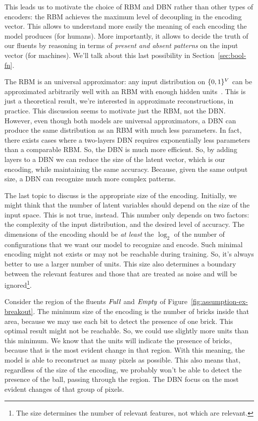This leads us to motivate the choice of RBM and DBN rather than other types of
encoders: the RBM achieves the maximum level of decoupling in the encoding
vector. This allows to understand more easily the meaning of each encoding the
model produces (for humans). More importantly, it allows to decide the truth
of our fluents by reasoning in terms of \emph{present and absent patterns} on
the input vector (for machines). We'll talk about this last possibility in
Section~\ref{sec:bool-fn}.

The RBM is an universal approximator: any input distribution on $\{0, 1\}^V$
can be approximated arbitrarily well with an RBM with enough hidden
units~\cite{bib:rbm-universality}. This is just a theoretical result, we're
interested in approximate reconstructions, in practice. This discussion
seems to motivate just the RBM, not the DBN. However, even though both models
are universal approximators, a DBN can produce the same distribution as an RBM
with much less parameters. In fact, there exists cases where a two-layers DBN
requires exponentially less parameters than a comparable RBM. So, the DBN is
much more efficient. So, by adding layers to a DBN we can reduce the size of
the latent vector, which is our encoding, while maintaining the same accuracy.
Because, given the same output size, a DBN can recognize much more complex
patterns.

The last topic to discuss is the appropriate size of the encoding. Initially,
we might think that the number of latent variables should depend on the size
of the input space. This is not true, instead. This number only depends on two
factors: the complexity of the input distribution, and the desired level of
accuracy. The dimensions of the encoding should be \emph{at least} the
$\log_2$ of the number of configurations that we want our model to recognize
and encode. Such minimal encoding might not exists or may not be reachable
during training. So, it's always better to use a larger number of units. This
size also determines a boundary between the relevant features and those that
are treated as noise and will be ignored\footnote{The size determines the
number of relevant features, not which are relevant.}.

\begin{example}
	Consider the region of the fluents $\text{\textit{Full}}$ and $\text{\textit{Empty}}$ of
	Figure~\ref{fig:assumption-ex-breakout}. The minimum size of the encoding
	is the number of bricks inside that area, because we may use each bit to
	detect the presence of one brick. This optimal result might not be
	reachable. So, we could use slightly more units than this minimum.
	We know that the units will indicate the presence of bricks, because that is
	the most evident change in that region. With this meaning, the model is able
	to reconstruct as many pixels as possible. This also means that, regardless
	of the size of the encoding, we probably won't be able to detect the
	presence of the ball, passing through the region. The DBN focus on the most
	evident changes of that group of pixels.
\end{example}

